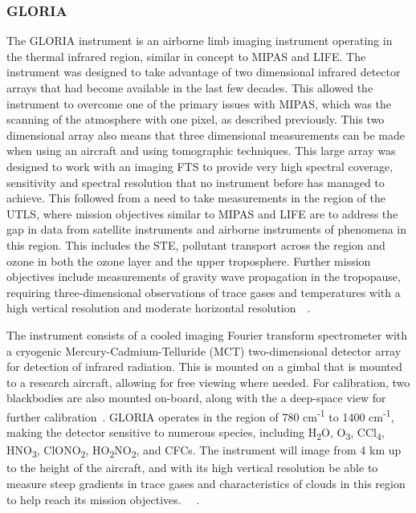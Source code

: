 \subsubsection{GLORIA}
The GLORIA instrument is an airborne limb imaging instrument operating in the thermal infrared region, similar in concept to MIPAS and LIFE. The instrument was designed to take advantage of two dimensional infrared detector arrays that had become available in the last few decades. This allowed the instrument to overcome one of the primary issues with MIPAS, which was the scanning of the atmosphere with one pixel, as described previously. This two dimensional array also means that three dimensional measurements can be made when using an aircraft and using tomographic techniques. This large array was designed to work with an imaging FTS to provide very high spectral coverage, sensitivity and spectral resolution that no instrument before has managed to achieve. This followed from a need to take measurements in the region of the UTLS, where mission objectives similar to MIPAS and LIFE are to address the gap in data from satellite instruments and airborne instruments of phenomena in this region. This includes the STE, pollutant transport across the region and ozone in both the ozone layer and the upper troposphere. Further mission objectives include measurements of gravity wave propagation in the tropopause, requiring three-dimensional observations of trace gases and temperatures with a high vertical resolution and moderate horizontal resolution~\citep{GLORIA_concept}~\citep{GLORIA_objectives}. 

The instrument consists of a cooled imaging Fourier transform spectrometer with a cryogenic Mercury-Cadmium-Telluride (MCT) two-dimensional detector array for detection of infrared radiation. This is mounted on a gimbal that is mounted to a research aircraft, allowing for free viewing where needed. For calibration, two blackbodies are also mounted on-board, along with the a deep-space view for further calibration~\citep{GLORIA_concept}. GLORIA operates in the region of  780 cm\textsuperscript{-1} to 1400 cm\textsuperscript{-1}, making the detector sensitive to numerous species, including H\textsubscript{2}O, O\textsubscript{3}, CCl\textsubscript{4}, HNO\textsubscript{3}, ClONO\textsubscript{2}, HO\textsubscript{2}NO\textsubscript{2}, and CFCs. The instrument will image from 4 km up to the height of the aircraft, and with its high vertical resolution be able to measure steep gradients in trace gases and characteristics of clouds in this region to help reach its mission objectives. ~\citep{GLORIA_PhD}~\citep{GLORIA_objectives}.

